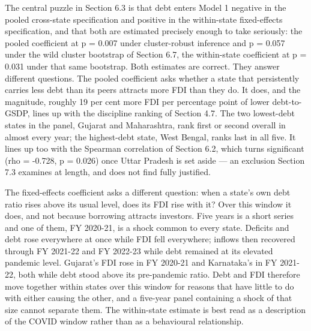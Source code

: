 \documentclass[12pt,a4paper]{article}
\begin{document}
The central puzzle in Section 6.3 is that debt enters Model 1 negative in the pooled cross-state specification and positive in the within-state fixed-effects specification, and that both are estimated precisely enough to take seriously: the pooled coefficient at p = 0.007 under cluster-robust inference and p = 0.057 under the wild cluster bootstrap of Section 6.7, the within-state coefficient at p = 0.031 under that same bootstrap. Both estimates are correct. They answer different questions. The pooled coefficient asks whether a state that persistently carries less debt than its peers attracts more FDI than they do. It does, and the magnitude, roughly 19 per cent more FDI per percentage point of lower debt-to-GSDP, lines up with the discipline ranking of Section 4.7. The two lowest-debt states in the panel, Gujarat and Maharashtra, rank first or second overall in almost every year; the highest-debt state, West Bengal, ranks last in all five. It lines up too with the Spearman correlation of Section 6.2, which turns significant (rho = -0.728, p = 0.026) once Uttar Pradesh is set aside --- an exclusion Section 7.3 examines at length, and does not find fully justified.

The fixed-effects coefficient asks a different question: when a state's own debt ratio rises above its usual level, does its FDI rise with it? Over this window it does, and not because borrowing attracts investors. Five years is a short series and one of them, FY 2020-21, is a shock common to every state. Deficits and debt rose everywhere at once while FDI fell everywhere; inflows then recovered through FY 2021-22 and FY 2022-23 while debt remained at its elevated pandemic level. Gujarat's FDI rose in FY 2020-21 and Karnataka's in FY 2021-22, both while debt stood above its pre-pandemic ratio. Debt and FDI therefore move together within states over this window for reasons that have little to do with either causing the other, and a five-year panel containing a shock of that size cannot separate them. The within-state estimate is best read as a description of the COVID window rather than as a behavioural relationship.
\end{document}
